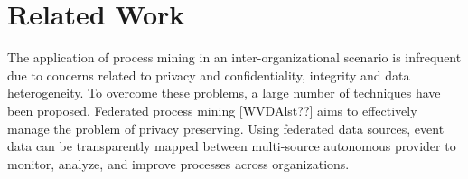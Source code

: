 

\section{Related Work}

The application of process mining in an inter-organizational scenario is infrequent due to concerns related to privacy and confidentiality, integrity and data heterogeneity. To overcome these problems, a large number of techniques have been proposed. Federated process mining [WVDAlst??] aims to effectively manage the problem of privacy preserving. Using federated data sources, event data can be transparently mapped between multi-source autonomous provider to monitor, analyze, and improve processes across organizations.












\label{sec:background}